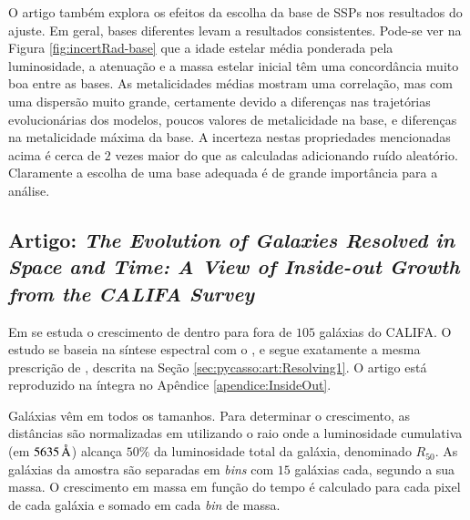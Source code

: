 O artigo também explora os efeitos da escolha da base de SSPs nos resultados do
ajuste. Em geral, bases diferentes levam a resultados consistentes.
Pode-se ver na Figura \ref{fig:incertRad-base} que a idade estelar
média ponderada pela luminosidade, a atenuação e a massa estelar inicial
têm uma concordância muito boa entre as bases. As metalicidades médias mostram
uma correlação, mas com uma dispersão muito grande, certamente devido a
diferenças nas trajetórias evolucionárias dos modelos, poucos valores
de metalicidade na base, e diferenças na metalicidade máxima da base. A
incerteza nestas propriedades mencionadas acima é cerca de $2$ vezes maior do
que as calculadas adicionando ruído aleatório. Claramente a escolha de uma base
adequada é de grande importância para a análise.



\subsection{Artigo: {\em The Evolution of Galaxies Resolved in Space and Time: A
View of Inside-out Growth from the CALIFA Survey}}
\label{sec:pycasso:art:InsideOut}

Em \citet{Perez2013} se estuda o crescimento de dentro para fora de $105$
galáxias do CALIFA. O estudo se baseia na síntese espectral com o \starlight, e
segue exatamente a mesma prescrição de \citet{CidFernandes2014}, descrita na
Seção \ref{sec:pycasso:art:Resolving1}. O artigo está reproduzido na íntegra no
Apêndice \ref{apendice:InsideOut}.

Galáxias vêm em todos os tamanhos. Para determinar o crescimento, as distâncias
são normalizadas em utilizando o raio onde a luminosidade cumulativa (em
$5635\,\text{\normalfont\AA}$) alcança $50\%$ da luminosidade total da galáxia, denominado
$R_{50}$. As galáxias da amostra são separadas em {\em bins} com $15$ galáxias
cada, segundo a sua massa. O crescimento em massa em função do tempo é calculado
para cada pixel de cada galáxia e somado em cada {\em bin} de massa.

